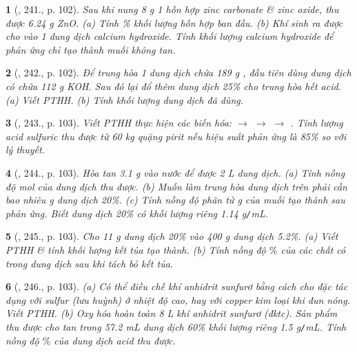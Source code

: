 \documentclass{article}
\newtheorem{baitoan}{}
\begin{document}
\begin{baitoan}[\cite{Nguyen_Buu_Can_500_BT_Hoa_Hoc_THCS}, 241., p. 102]
	Sau khi nung {\rm8 g} 1 hỗn hợp zinc carbonate \& zinc oxide, thu được {\rm6.24 g ZnO}. (a) Tính \% khối lượng hỗn hợp ban đầu. (b) Khí sinh ra được cho vào 1 dung dịch calcium hydroxide. Tính khối lượng calcium hydroxide để phản ứng chỉ tạo thành muối không tan.
\end{baitoan}

\begin{baitoan}[\cite{Nguyen_Buu_Can_500_BT_Hoa_Hoc_THCS}, 242., p. 102]
	Để trung hòa 1 dung dịch chứa {\rm189 g }, đầu tiên dùng dung dịch có chứa {\rm112 g KOH}. Sau đó lại đổ thêm dung dịch {\rm{} 25\%} cho trung hòa hết acid. (a) Viết {\rm PTHH}. (b) Tính khối lượng dung dịch {\rm{}} đã dùng.
\end{baitoan}

\begin{baitoan}[\cite{Nguyen_Buu_Can_500_BT_Hoa_Hoc_THCS}, 243., p. 103]
	Viết {\rm PTHH} thực hiện các biến hóa: {\rm{} $\to$  $\to$  $\to$ }. Tính lượng acid sulfuric thu được từ {\rm60 kg} quặng pirit nếu hiệu suất phản ứng là {\rm85\%} so với lý thuyết.
\end{baitoan}

\begin{baitoan}[\cite{Nguyen_Buu_Can_500_BT_Hoa_Hoc_THCS}, 244., p. 103]
	Hòa tan {\rm3.1 g } vào nước để được {\rm2 L} dung dịch. (a) Tính nồng độ mol của dung dịch thu được. (b) Muốn làm trung hòa dung dịch trên phải cần bao nhiêu {\rm g} dung dịch {\rm{} 20\%}. (c) Tính nồng độ phân tử {\rm g} của muối tạo thành sau phản ứng. Biết dung dịch {\rm{} 20\%} có khối lượng riêng {\rm1.14 g{\tt/}mL}.
\end{baitoan}

\begin{baitoan}[\cite{Nguyen_Buu_Can_500_BT_Hoa_Hoc_THCS}, 245., p. 103]
	Cho {\rm11 g} dung dịch {\rm{} 20\%} vào {\rm400 g} dung dịch {\rm{} 5.2\%}. (a) Viết {\rm PTHH} \& tính khối lượng kết tủa tạo thành. (b) Tính nồng độ $\%$ của các chất có trong dung dịch sau khi tách bỏ kết tủa.
\end{baitoan}

\begin{baitoan}[\cite{Nguyen_Buu_Can_500_BT_Hoa_Hoc_THCS}, 246., p. 103]
	(a) Có thể điều chế khí anhidrit sunfurơ bằng cách cho {\rm{}} đặc tác dụng với sulfur (lưu huỳnh) ở nhiệt độ cao, hay với copper kim loại khi đun nóng. Viết {\rm PTHH}. (b) Oxy hóa hoàn toàn {\rm8 L} khí anhidrit sunfurơ {\rm{}} (đktc). Sản phẩm thu được cho tan trong {\rm57.2 mL} dung dịch {\rm{} 60\%} khối lượng riêng {\rm1.5 g{\tt/}mL}. Tính nồng độ $\%$ của dung dịch acid thu được.
\end{baitoan}
\end{document}
